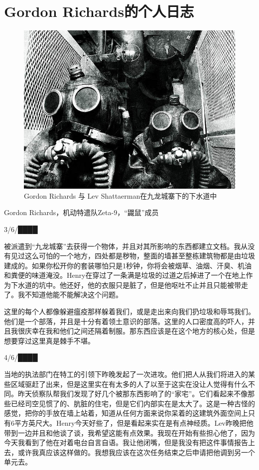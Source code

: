 \section{Gordon Richards的个人日志}

\label{sec:DOC-personal-log-of-gordon-richards}

\begin{figure}[H]
    \centering
    \includegraphics[width=0.5\linewidth]{images/personal-log-of-gordon-richards.jpg}
    \caption*{Gordon Richards 与 Lev Shattaerman在九龙城寨下的下水道中}
\end{figure}

Gordon Richards，机动特遣队Zeta-9，“鼹鼠”成员

3\slash 6\slash ████

被派遣到“九龙城寨”去获得一个物体，并且对其所影响的东西都建立文档。我从没有见过这么可怕的一个地方，四处都是秽物，整面的墙甚至整栋建筑物都是由垃圾建成的。如果你松开你的套装哪怕只是1秒钟，你将会被烟草、油烟、汗臭、机油和粪便的味道淹没。Henry在穿过了一条满是垃圾的过道之后掉进了一个在地上作为下水道的坑中。他还好，他的衣服只是脏了，但是他呕吐不止并且只能被带走了。我不知道他能不能解决这个问题。

这里的每个人都像躲避瘟疫那样躲着我们，或是走出来向我们扔垃圾和辱骂我们。他们是一个部落，并且是十分有着领土意识的部落。这里的人口密度高的吓人，并且我很庆幸在我和他们之间还隔着制服。那东西应该是在这个地方的核心处，但是想要穿过这里真是棘手不堪。

\hr

4\slash 6\slash ████

当地的执法部门在特工的引领下昨晚发起了一次进攻。他们把人从我们将进入的某些区域驱赶了出来，但是这里实在有太多的人了以至于这实在没让人觉得有什么不同。昨天侦察队帮我们发现了好几个被那东西影响了的“家宅”。它们看起来不像那些已经司空见惯了的、肮脏的住宅，但是它们内部实在是太大了。这是一种古怪的感觉，把你的手放在墙上站着，知道从任何方面来说你呆着的这建筑外面空间上只有6平方英尺大。Henry今天好些了，但是看起来实在是有点神经质。Lev昨晚把他带到一边并且和他谈了谈，我希望这能有点效果。我现在开始有些担心他了，因为今天我看到了他在对着电台自言自语。我让他闭嘴，但是我没有把这件事情报告上去，或许我真应该这样做的。我想我应该在这次任务结束之后申请把他调到另一个单元去。

